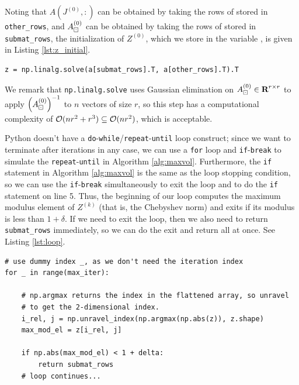 \documentclass{article}
\begin{document}
	Noting that $A\left(J^{(0)}, :\right)$ can be obtained by taking the rows of \va{} stored in \texttt{other\_rows}, and $A_\boxdot^{(0)}$ can be obtained by taking the rows of \va{} stored in \texttt{submat\_rows}, the initialization of $Z^{(0)}$, which we store in the variable \vz{}, is given in Listing \ref{lst:z_initial}.
	\begin{lstlisting}[caption={$Z^{(0)}$ initialization}, label=lst:z_initial]
z = np.linalg.solve(a[submat_rows].T, a[other_rows].T).T
	\end{lstlisting}
	We remark that \texttt{np.linalg.solve} uses Gaussian elimination on $A_\boxdot^{(0)} \in \textnormal{\bf R}^{r\times r}$ to apply $\left(A_\boxdot^{(0)}\right)^{-1}$ to $n$ vectors of size $r$, so this step has a computational complexity of $\mathcal{O}(nr^2 + r^3) \subseteq \mathcal{O}(nr^2)$, which is acceptable.
	
	
	Python doesn't have a \texttt{do}-\texttt{while}/\texttt{repeat}-\texttt{until} loop construct; since we want to terminate after \vmaxiter{} iterations in any case, we can use a \texttt{for} loop and \texttt{if}-\texttt{break} to simulate the \texttt{repeat}-\texttt{until} in Algorithm \ref{alg:maxvol}. Furthermore, the \texttt{if} statement in Algorithm \ref{alg:maxvol} is the same as the loop stopping condition, so we can use the \texttt{if}-\texttt{break} simultaneously to exit the loop and to do the \texttt{if} statement on line 5. Thus, the beginning of our loop computes the maximum modulus element of $Z^{(k)}$ (that is, the Chebyshev norm) and exits if its modulus is less than $1 + \delta$. If we need to exit the loop, then we also need to return \texttt{submat\_rows} immediately, so we can do the exit and return all at once. See Listing \ref{lst:loop}.
	\begin{lstlisting}[caption={loop setup}, label=lst:loop]
# use dummy index _, as we don't need the iteration index
for _ in range(max_iter):

    # np.argmax returns the index in the flattened array, so unravel
    # to get the 2-dimensional index.
    i_rel, j = np.unravel_index(np.argmax(np.abs(z)), z.shape)
    max_mod_el = z[i_rel, j]
    
    if np.abs(max_mod_el) < 1 + delta:
        return submat_rows
    # loop continues...
	\end{lstlisting}
	
	
\end{document}
